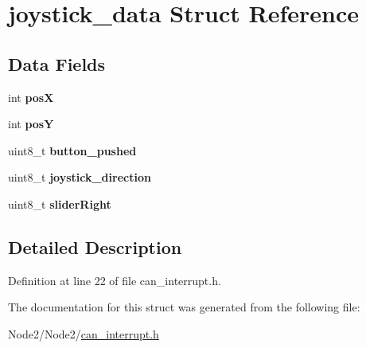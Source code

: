 \hypertarget{structjoystick__data}{}\section{joystick\+\_\+data Struct Reference}
\label{structjoystick__data}
\subsection*{Data Fields}
\begin{DoxyCompactItemize}
\item 
\mbox{\label{structjoystick__data_a0fd5ccab4481bb6d3e87688660475d21}} 
int {\bfseries posX}
\item 
\mbox{\label{structjoystick__data_a34fdf3c3cecfe1d0d655fc4d94a45106}} 
int {\bfseries posY}
\item 
\mbox{\label{structjoystick__data_ac170331554c666db75934397a10c03c5}} 
uint8\+\_\+t {\bfseries button\+\_\+pushed}
\item 
\mbox{\label{structjoystick__data_ae3f8a34e5461d3250ec211058e71c1e8}} 
uint8\+\_\+t {\bfseries joystick\+\_\+direction}
\item 
\mbox{\label{structjoystick__data_a922c3f47668bc1951a7c7dba0e02a6dd}} 
uint8\+\_\+t {\bfseries slider\+Right}
\end{DoxyCompactItemize}


\subsection{Detailed Description}


Definition at line 22 of file can\+\_\+interrupt.\+h.



The documentation for this struct was generated from the following file\+:\begin{DoxyCompactItemize}
\item 
Node2/\+Node2/\hyperlink{can__interrupt_8h}{can\+\_\+interrupt.\+h}\end{DoxyCompactItemize}
